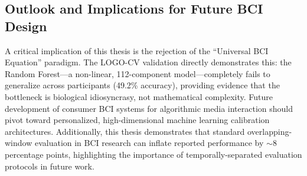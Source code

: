 \documentclass[12pt,a4paper]{report}
\begin{document}

\subsection{Outlook and Implications for Future BCI Design}
A critical implication of this thesis is the rejection of the ``Universal BCI Equation'' paradigm. The LOGO-CV validation directly demonstrates this: the Random Forest---a non-linear, 112-component model---completely fails to generalize across participants (49.2\% accuracy), providing evidence that the bottleneck is biological idiosyncrasy, not mathematical complexity. Future development of consumer BCI systems for algorithmic media interaction should pivot toward personalized, high-dimensional machine learning calibration architectures. Additionally, this thesis demonstrates that standard overlapping-window evaluation in BCI research can inflate reported performance by $\sim$8 percentage points, highlighting the importance of temporally-separated evaluation protocols in future work.
\end{document}
